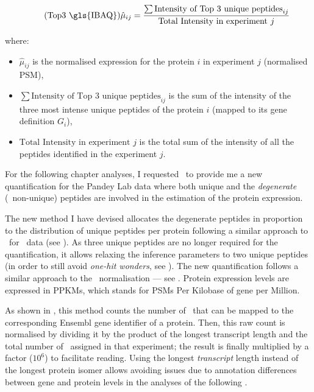 \begin{minipage}{\textwidth}
\begin{equation}
    \tag{Top3 \gls{IBAQ}}\label{eq:Top3}
    \hat{\mu}_{ij}=\frac{\sum \text{Intensity of Top 3 unique peptides} _{ij}}{\text{Total Intensity in experiment } j}
    \raisetag{3\normalbaselineskip}
\end{equation}

where:{\small
\begin{itemize}[topsep=0pt,nosep]
    \item $\hat{\mu}_{ij}$ is the normalised expression for the protein $i$ in experiment $j$ (normalised \gls{PSM}),
    \item $\sum \text{Intensity of Top 3 unique peptides} _{ij}$ is
        the sum of the intensity of the three most intense unique peptides
        of the protein $i$ (mapped to its gene definition $G_i$),
    \item $\text{Total Intensity in experiment } j$ is the total sum of the intensity of all
the peptides identified in the experiment $j$.
\end{itemize}
}
\end{minipage}

For the following chapter analyses,
I requested \james\ to provide me a new quantification for the Pandey Lab data
where both unique and
the \emph{degenerate} (\ie\ non-unique) peptides
are involved in the estimation of the protein expression.\mybr\

The new method I have devised allocates the degenerate peptides
in proportion to the distribution of unique peptides per protein
following a similar approach to \cuffl\ for \Rnaseq\ data (see ).
As three unique peptides are no longer required for the quantification,
it allows relaxing the inference parameters to two unique peptides
(in order to still avoid \emph{one-hit wonders}, see ).
The new quantification follows a similar approach to the \RPKM\ normalisation ---
see .
Protein expression levels are expressed in \glspl{PPKM},
which stands for \glspl{PSM} Per Kilobase of gene per Million.\mybr\

As shown in ,
this method counts the number of \psms\
that can be mapped to the corresponding \gls{Ensembl} gene identifier of a protein.
Then, this raw count is normalised by dividing it
by the product of the longest transcript length and the total number of \psms\
assigned in that experiment;
the result is finally multiplied by a factor ($10^6$) to facilitate reading.
Using the longest \emph{transcript} length
instead of the longest protein isomer allows avoiding issues due to
annotation differences between gene and protein levels
in the analyses of the following \Cref{ch:Integration}.\mybr\


